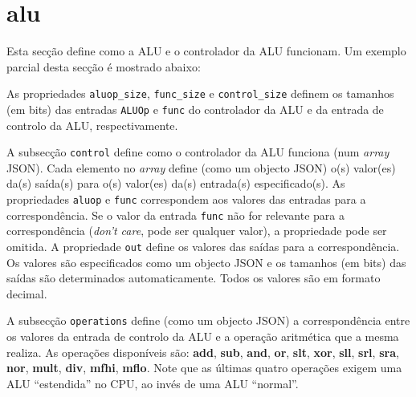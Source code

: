 \documentclass[11pt,a4paper,twoside,titlepage]{report}
\begin{document}
\section{alu}

Esta secção define como a ALU e o controlador da ALU funcionam.
Um exemplo parcial desta secção é mostrado abaixo:



As propriedades \verb+aluop_size+, \verb+func_size+ e \verb+control_size+
definem os tamanhos (em bits) das entradas \verb+ALUOp+ e \verb+func+ do
controlador da ALU e da entrada de controlo da ALU, respectivamente.

A subsecção \verb+control+ define como o controlador da ALU funciona (num
\emph{array} JSON).
Cada elemento no \emph{array} define (como um objecto JSON) o(s) valor(es)
da(s) saída(s) para o(s) valor(es) da(s) entrada(s) especificado(s).
As propriedades \verb+aluop+ e \verb+func+ correspondem aos valores das
entradas para a correspondência. Se o valor da entrada \verb+func+ não for
relevante para a correspondência (\emph{don't care}, pode ser qualquer valor),
a propriedade pode ser omitida.
A propriedade \verb+out+ define os valores das saídas para a correspondência.
Os valores são especificados como um objecto JSON e os tamanhos (em bits) das
saídas são determinados automaticamente.
Todos os valores são em formato decimal.

A subsecção \verb+operations+ define (como um objecto JSON) a correspondência
entre os valores da entrada de controlo da ALU e a operação aritmética que a
mesma realiza.
As operações disponíveis são: \textbf{add}, \textbf{sub}, \textbf{and}, \textbf{or},
\textbf{slt}, \textbf{xor}, \textbf{sll}, \textbf{srl}, \textbf{sra}, \textbf{nor},
\textbf{mult}, \textbf{div}, \textbf{mfhi}, \textbf{mflo}.
Note que as últimas quatro operações exigem uma ALU ``estendida'' no CPU, ao
invés de uma ALU ``normal''.
\end{document}
